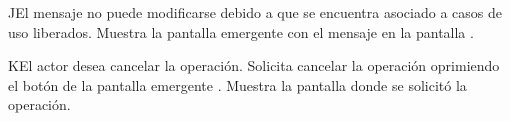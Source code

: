  \begin{UCtrayectoriaA}{J}{El mensaje no puede modificarse debido a que se encuentra asociado a casos de uso liberados.}
    \UCpaso[\UCsist] Muestra la pantalla emergente con el mensaje  en la pantalla .
 \end{UCtrayectoriaA}
 \begin{UCtrayectoriaA}{K}{El actor desea cancelar la operación.}
    \UCpaso[\UCactor] Solicita cancelar la operación oprimiendo el botón  de la pantalla emergente .
    \UCpaso[\UCsist] Muestra la pantalla donde se solicitó la operación.
 \end{UCtrayectoriaA}